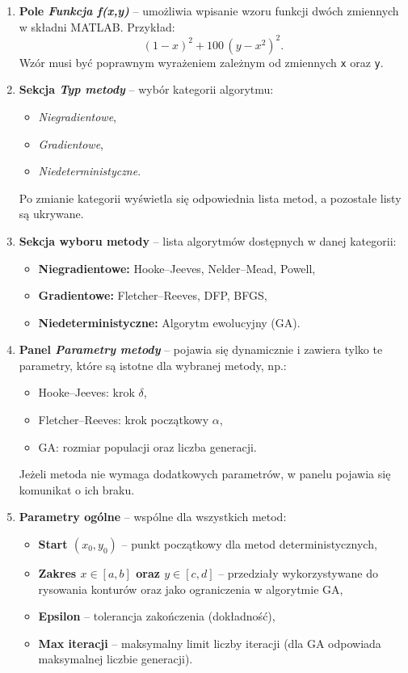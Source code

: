 \documentclass[10pt,a4paper]{article}
\begin{document}
\begin{enumerate}
\item \textbf{Pole \emph{Funkcja f(x,y)}} – umożliwia wpisanie wzoru funkcji dwóch zmiennych w składni MATLAB.
Przykład:
\[
(1-x)^2 + 100\,(y-x^2)^2.
\]
Wzór musi być poprawnym wyrażeniem zależnym od zmiennych \texttt{x} oraz \texttt{y}.

\item \textbf{Sekcja \emph{Typ metody}} – wybór kategorii algorytmu:
\begin{itemize}
\item \emph{Niegradientowe},
\item \emph{Gradientowe},
\item \emph{Niedeterministyczne}.
\end{itemize}
Po zmianie kategorii wyświetla się odpowiednia lista metod, a pozostałe listy są ukrywane.

\item \textbf{Sekcja wyboru metody} – lista algorytmów dostępnych w danej kategorii:
\begin{itemize}
\item \textbf{Niegradientowe:} Hooke--Jeeves, Nelder--Mead, Powell,
\item \textbf{Gradientowe:} Fletcher--Reeves, DFP, BFGS,
\item \textbf{Niedeterministyczne:} Algorytm ewolucyjny (GA).
\end{itemize}

\item \textbf{Panel \emph{Parametry metody}} – pojawia się dynamicznie i zawiera tylko te parametry,
które są istotne dla wybranej metody, np.:
\begin{itemize}
\item Hooke--Jeeves: krok $\delta$,
\item Fletcher--Reeves: krok początkowy $\alpha$,
\item GA: rozmiar populacji oraz liczba generacji.
\end{itemize}
Jeżeli metoda nie wymaga dodatkowych parametrów, w panelu pojawia się komunikat o ich braku.

\item \textbf{Parametry ogólne} – wspólne dla wszystkich metod:
\begin{itemize}
\item \textbf{Start $(x_0,y_0)$} – punkt początkowy dla metod deterministycznych,
\item \textbf{Zakres $x\in[a,b]$ oraz $y\in[c,d]$} – przedziały wykorzystywane do rysowania konturów oraz
jako ograniczenia w algorytmie GA,
\item \textbf{Epsilon} – tolerancja zakończenia (dokładność),
\item \textbf{Max iteracji} – maksymalny limit liczby iteracji (dla GA odpowiada maksymalnej liczbie generacji).
\end{itemize}


\end{enumerate}
\end{document}
